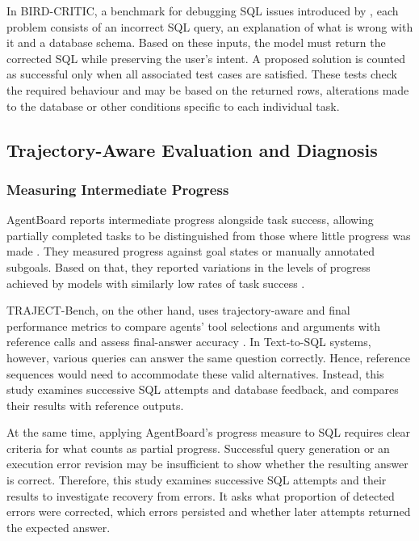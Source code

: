 In BIRD-CRITIC, a benchmark for debugging SQL issues introduced by \citet{li2025swesql}, 
each problem consists of an incorrect SQL query, 
an explanation of what is wrong with it and a database schema. 
Based on these inputs, the model must return the corrected SQL while preserving the user's intent. 
A proposed solution is counted as successful only when all associated test cases are satisfied. 
These tests check the required behaviour and may be based on the returned rows, 
alterations made to the database or other conditions specific to each individual task.

\subsection{Trajectory-Aware Evaluation and Diagnosis}
\label{sec:literature-trajectories}

\subsubsection{Measuring Intermediate Progress}

AgentBoard reports intermediate progress alongside task success, 
allowing partially completed tasks to be distinguished from those 
where little progress was made \citep{ma2024agentboard}. 
They measured progress against goal states or manually annotated subgoals. 
Based on that, they reported variations in the levels of progress achieved 
by models with similarly low rates of task success \citep[Section~4.2]{ma2024agentboard}.

TRAJECT-Bench, on the other hand, 
uses trajectory-aware and final performance metrics to compare agents' 
tool selections and arguments with reference calls 
and assess final-answer accuracy \citep{he2026trajectbench}.
In Text-to-SQL systems, however, 
various queries can answer the same question correctly. 
Hence, reference sequences would need to accommodate these valid alternatives.
Instead, this study examines successive SQL attempts and database feedback,
and compares their results with reference outputs.

At the same time, applying AgentBoard's progress measure to SQL requires clear criteria for what counts as partial progress.
Successful query generation or an execution error revision may be insufficient to show
whether the resulting answer is correct. 
Therefore, this study examines successive SQL attempts and their results 
to investigate recovery from errors. 
It asks what proportion of detected errors were corrected, 
which errors persisted and whether later attempts returned the expected answer.

